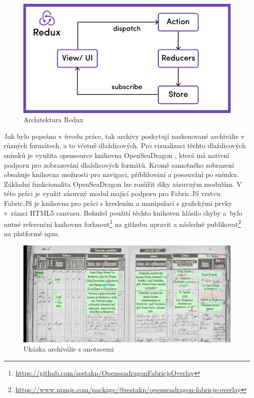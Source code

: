 \begin{figure}[htbp]
    \centering
        \includegraphics[scale=.6]{obrazky-figures/implementation/redux_architecture.png}
        \caption{Architektura Redux\protect\footnotemark}
\end{figure}


\noindent
Jak bylo popsáno v úvodu práce, tak archivy poskytují naskenované archiválie v různých formátech, a to včetně dlaždicových. Pro vizualizaci těchto dlaždicových snímků je využita opensource knihovna OpenSeaDragon \cite{openSeaDragon}, která má nativní podporu pro zobrazování dlaždicových formátů. Kromě samotného zobrazení obsahuje knihovna možnosti pro navigaci, přibližování a posouvání po snímku. Základní funkcionalita OpenSeaDragon lze rozšířit díky zásuvným modulům. V této práci je využit zásuvný modul mající podporu pro Fabric.JS vrstvu. Fabric.JS \cite{fabricJs} je knihovna pro práci s kreslením a manipulací s grafickými prvky v~rámci HTML5 canvasu. Bohužel použití těchto knihoven hlásilo chyby a~bylo nutné referenční knihovnu forknout\footnote{\href{https://github.com/sestakp/OpenseadragonFabricjsOverlay}{https://github.com/sestakp/OpenseadragonFabricjsOverlay}} na githubu upravit a následně publikovat\footnote{\href{https://www.npmjs.com/package/@sestakp/openseadragon-fabricjs-overlay}{https://www.npmjs.com/package/@sestakp/openseadragon-fabricjs-overlay}} na platformě npm.

\begin{figure}[htbp]
    \centering
        \includegraphics[scale=.4]{obrazky-figures/implementation/notesExample.PNG}
        \caption{Ukázka archiválie s anotacemi}
\end{figure}

